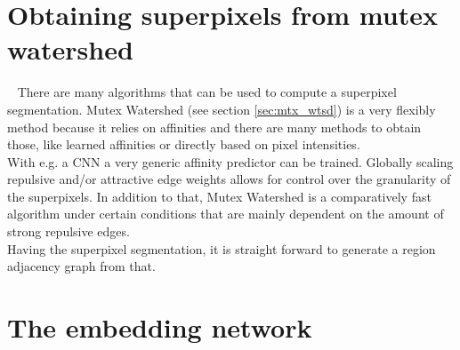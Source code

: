\section{Obtaining superpixels from mutex watershed}~\label{seg:pip_mutex}
There are many algorithms that can be used to compute a superpixel segmentation. Mutex Watershed (see section \ref{sec:mtx_wtsd}) is a very flexibly method because it relies on affinities and there are many methods to obtain those, like learned affinities or directly based on pixel intensities.\\
With e.g. a CNN a very generic affinity predictor can be trained. Globally scaling repulsive and/or attractive edge weights allows for control over the granularity of the superpixels. In addition to that, Mutex Watershed is a comparatively fast algorithm under certain conditions that are mainly dependent on the amount of strong repulsive edges.\\
Having the superpixel segmentation, it is straight forward to generate a region adjacency graph from that.

\section{The embedding network}~\label{seg:pip_embed}

